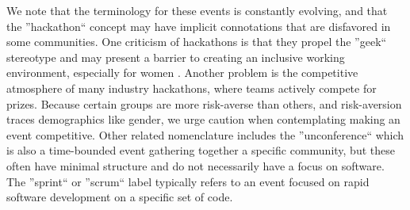We note that the terminology for these events is constantly evolving, and that the ''hackathon`` concept may have implicit connotations that are disfavored in some communities.
One criticism of hackathons is that they propel the ''geek`` stereotype and may present a barrier to creating an inclusive working environment, especially for women \citep{Decker2015}.
Another problem is the competitive atmosphere of many industry hackathons, where teams actively compete for prizes.
Because certain groups are more risk-averse than others, and risk-aversion traces demographics like gender, we urge caution when contemplating making an event competitive.
Other related nomenclature includes the ''unconference`` which is also a time-bounded event gathering together a specific community, but these often have minimal structure and do not necessarily have a focus on software.
The ''sprint`` or ''scrum`` label typically refers to an event focused on rapid software development on a specific set of code.
